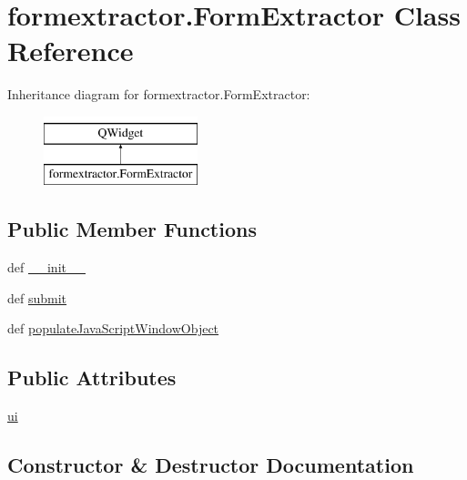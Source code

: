 \hypertarget{classformextractor_1_1FormExtractor}{}\section{formextractor.\+Form\+Extractor Class Reference}
\label{classformextractor_1_1FormExtractor}
Inheritance diagram for formextractor.\+Form\+Extractor\+:\begin{figure}[H]
\begin{center}
\leavevmode
\includegraphics[height=2.000000cm]{classformextractor_1_1FormExtractor}
\end{center}
\end{figure}
\subsection*{Public Member Functions}
\begin{DoxyCompactItemize}
\item 
def \hyperlink{classformextractor_1_1FormExtractor_a9dca252231bc4dabbc1ee9fa9c766261}{\+\_\+\+\_\+init\+\_\+\+\_\+}
\item 
def \hyperlink{classformextractor_1_1FormExtractor_ae9a9c9b1f5d7f257d5ab7d926d507333}{submit}
\item 
def \hyperlink{classformextractor_1_1FormExtractor_ab18d5a78f4412ef4f275005079f8f19b}{populate\+Java\+Script\+Window\+Object}
\end{DoxyCompactItemize}
\subsection*{Public Attributes}
\begin{DoxyCompactItemize}
\item 
\hyperlink{classformextractor_1_1FormExtractor_a8fc01b9052abaffcd10387f7870421aa}{ui}
\end{DoxyCompactItemize}


\subsection{Constructor \& Destructor Documentation}
\hypertarget{classformextractor_1_1FormExtractor_a9dca252231bc4dabbc1ee9fa9c766261}{}
